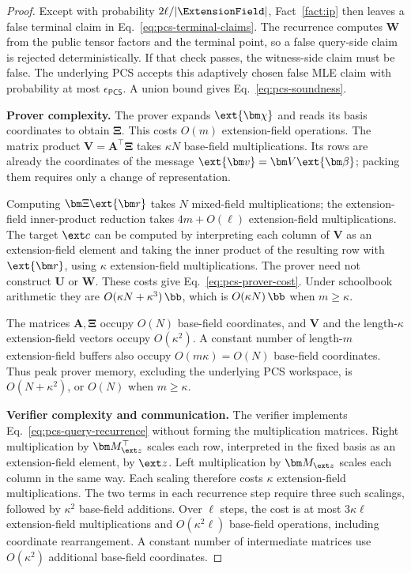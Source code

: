 \begin{proof}
Except with probability \(2\ell/|\ExtensionField|\),
Fact~\ref{fact:ip} then leaves a false terminal claim in
Eq.~\eqref{eq:pcs-terminal-claims}.
The recurrence computes \(\bm W\) from the public tensor factors
and the terminal point, so a false query-side claim is rejected
deterministically. If that check passes, the witness-side claim
must be false. The underlying PCS accepts this adaptively chosen
false MLE claim with probability at most
\(\epsilon_{\mathsf{PCS}}\).
A union bound gives Eq.~\eqref{eq:pcs-soundness}.

\smallskip\noindent\textbf{Prover complexity.}
The prover expands \(\ext{\bm\chi}\) and reads its basis
coordinates to obtain \(\bm\Xi\).
This costs \(O(m)\) extension-field operations.
The matrix product \(\bm V=\bm A^\top\bm\Xi\) takes
\(\kappa N\) base-field multiplications. Its rows are already
the coordinates of the message
\(\ext{\bm v}=\bm V\ext{\bm\beta}\); packing them requires
only a change of representation.

Computing \(\bm\Xi\ext{\bm r}\) takes \(N\) mixed-field
multiplications; the extension-field inner-product reduction takes
\(4m+O(\ell)\) extension-field multiplications.
The target \(\ext c\) can be computed by interpreting each column
of \(\bm V\) as an extension-field element and taking the inner
product of the resulting row with \(\ext{\bm r}\), using
\(\kappa\) extension-field multiplications.
The prover need not construct \(\bm U\) or \(\bm W\).
These costs give Eq.~\eqref{eq:pcs-prover-cost}.
Under schoolbook arithmetic they are
\(O(\kappa N+\kappa^3)\,\bb\), which is
\(O(\kappa N)\,\bb\) when \(m\geq\kappa\).

The matrices \(\bm A,\bm\Xi\) occupy \(O(N)\) base-field
coordinates, and \(\bm V\) and the length-\(\kappa\)
extension-field vectors occupy \(O(\kappa^2)\).
A constant number of length-\(m\) extension-field buffers also
occupy \(O(m\kappa)=O(N)\) base-field coordinates.
Thus peak prover memory, excluding the underlying PCS workspace,
is \(O(N+\kappa^2)\), or \(O(N)\) when \(m\geq\kappa\).

\smallskip\noindent\textbf{Verifier complexity and communication.}
The verifier implements Eq.~\eqref{eq:pcs-query-recurrence}
without forming the multiplication matrices.
Right multiplication by \(\bm M_{\ext z}^\top\) scales each
row, interpreted in the fixed basis as an extension-field element,
by \(\ext z\). Left multiplication by \(\bm M_{\ext z}\)
scales each column in the same way. Each scaling therefore costs
\(\kappa\) extension-field multiplications.
The two terms in each recurrence step require three such scalings,
followed by \(\kappa^2\) base-field additions.
Over \(\ell\) steps, the cost is at most
\(3\kappa\ell\) extension-field multiplications and
\(O(\kappa^2\ell)\) base-field operations, including coordinate
rearrangement. A constant number of intermediate matrices use
\(O(\kappa^2)\) additional base-field coordinates.


\end{proof}
